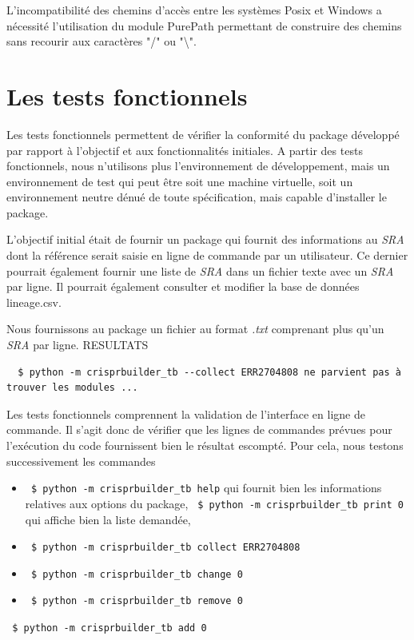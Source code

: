 \documentclass[twoside,a4paper,11pt,frenchb,openany]{report}
\begin{document}
L'incompatibilité des chemins d'accès entre les systèmes Posix et Windows a nécessité l'utilisation du module PurePath permettant de construire des chemins sans recourir aux caractères "/" ou "\textbackslash".



\section{Les tests fonctionnels}

Les tests fonctionnels permettent de vérifier la conformité du package développé par rapport à l'objectif et aux fonctionnalités initiales. A partir des tests fonctionnels, nous n'utilisons plus l'environnement de développement, mais un environnement de test qui peut être soit une machine virtuelle, soit un environnement neutre dénué de toute spécification, mais capable d'installer le package.

L'objectif initial était de fournir un package qui fournit des informations au \textit{SRA} dont la référence serait saisie en ligne de commande par un utilisateur. Ce dernier pourrait également fournir une liste de \textit{SRA} dans un fichier texte avec un \textit{SRA} par ligne. Il pourrait également consulter et modifier la base de données lineage.csv.

Nous fournissons au package un fichier au format \textit{.txt} comprenant plus qu'un \textit{SRA} par ligne. RESULTATS  

\begin{verbatim}
  $ python -m crisprbuilder_tb --collect ERR2704808 ne parvient pas à trouver les modules ...
\end{verbatim}

Les tests fonctionnels comprennent la validation de l'interface en ligne de commande. Il s'agit donc de vérifier que les lignes de commandes prévues pour l'exécution du code fournissent bien le résultat escompté. Pour cela, nous testons successivement les commandes

\begin{itemize}
\item \texttt{  \$ python -m crisprbuilder\_tb \textemdash \textemdash help} qui fournit bien les informations relatives aux options du package,
\texttt{  \$ python -m crisprbuilder\_tb \textemdash \textemdash print 0} qui affiche bien la liste demandée,
\item \texttt{  \$ python -m crisprbuilder\_tb \textemdash \textemdash collect ERR2704808}
\item \texttt{  \$ python -m crisprbuilder\_tb \textemdash \textemdash change 0}
\item \texttt{  \$ python -m crisprbuilder\_tb \textemdash \textemdash remove 0}
\end{itemize}
\texttt{  \$ python -m crisprbuilder\_tb \textemdash \textemdash add 0}
\end{document}
